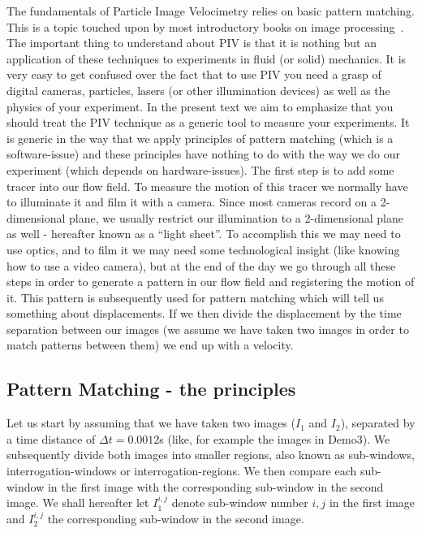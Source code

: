 \documentclass{book}
\begin{document}
The fundamentals of Particle Image Velocimetry relies on basic pattern
matching. This is a topic touched upon by most introductory books on
image processing~\cite[see for example][]{Gonzales:1992}. The important
thing to understand about PIV is that it is nothing but an application
of these techniques to experiments in fluid (or solid) mechanics. It is
very easy to get confused over the fact that to use PIV you need a grasp
of digital cameras, particles, lasers (or other illumination devices) as
well as the physics of your experiment. In the present text we aim to
emphasize that you should treat the PIV technique as a generic tool to
measure your experiments. It is generic in the way that we apply
principles of pattern matching (which is a software-issue) and these
principles have nothing to do with the way we do our experiment (which
depends on hardware-issues). The first step is to add some tracer into
our flow field. To measure the motion of this tracer we normally have to
illuminate it and film it with a camera. Since most cameras record on a
2-dimensional plane, we usually restrict our illumination to a
2-dimensional plane as well - hereafter known as a ``light sheet''. To
accomplish this we may need to use optics, and to film it we may need
some technological insight (like knowing how to use a video camera), but
at the end of the day we go through all these steps in order to generate
a pattern in our flow field and registering the motion of it. This
pattern is subsequently used for pattern matching which will tell us
something about displacements. If we then divide the displacement by the
time separation between our images (we assume we have taken two images
in order to match patterns between them) we end up with a velocity.

\subsection{Pattern Matching - the principles}

Let us start by assuming that we have taken two images ($I_1$ and
$I_2$), separated by a time distance of $\Delta t = 0.0012$s (like, for
example the images in Demo3). We subsequently divide both images into
smaller regions, also known as sub-windows, interrogation-windows or
interrogation-regions. We then compare each sub-window in the first
image with the corresponding sub-window in the second image. We shall
hereafter let $I_1^{i,j}$ denote sub-window number $i,j$ in the first
image and $I_2^{i,j}$ the corresponding sub-window in the second image. 
\end{document}
